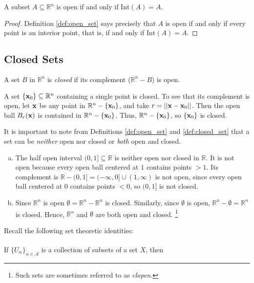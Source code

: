 \documentclass[12pt,letterpaper,reqno]{article}
\numberwithin{equation}{section}
\newcommand{\R}{\ensuremath{\mathbb R}}
\newcommand{\bx}{{\bf x}}
\begin{document}
{\begin{prop}
	A subset $A \subseteq \R^n$ is open if and only if $\text{Int}(A)=A$.
\end{prop}

\begin{proof}
	Definition \ref{def:open_set} says precisely that $A$ is open if and only if every point is an interior point, that is, if and only if $\text{Int}(A)=A$.
\end{proof}

\subsection{Closed Sets}
\begin{defn}\label{def:closed_set}
	A set $B$ in $\R^n$ is \emph{closed} if its complement ($\R^n-B$) is open.
\end{defn}

\begin{example}
A set $\{\bx_0\} \subseteq \R^n$ containing a single point is closed. To see that its complement is open, let $\bx$ be any point in $\R^n-\{\bx_0\}$, and take $r=||\bx-\bx_0||$. Then the open ball $B_r(\bx)$ is contained in $\R^n-\{\bx_0\}$. Thus, $\R^n-\{\bx_0\}$, so $\{\bx_0\}$ is closed.
\end{example}


It is important to note from Definitions \ref{def:open_set} and \ref{def:closed_set} that a set can be \emph{neither} open nor closed or \emph{both} open and closed.

\begin{example}
\begin{enumerate}[(a)]
\item The half open interval $(0,1] \subseteq \R$ is neither open nor closed in $\R$. It is not open because every open ball centered at $1$ contains points $>1$. Its complement is $\R-(0,1]=(-\infty,0]\cup(1,\infty)$ is not open, since every open ball centered at $0$ contains points $<0$, so $(0,1]$ is not closed.
\item Since $\R^n$ is open $\emptyset=\R^n-\R^n$ is closed. Similarly, since $\emptyset$ is open, $\R^n-\emptyset=\R^n$ is closed. Hence, $\R^n$ and $\emptyset$ are both open and closed. \footnote{Such sets are sometimes referred to as \emph{clopen}.}
\end{enumerate}	
\end{example}

Recall the following set theoretic identities:\\
\\
If $\{U_\alpha\}_{\alpha \in \mathscr{A}}$ is a collection of subsets of a set $X$, then 

}
\end{document}

